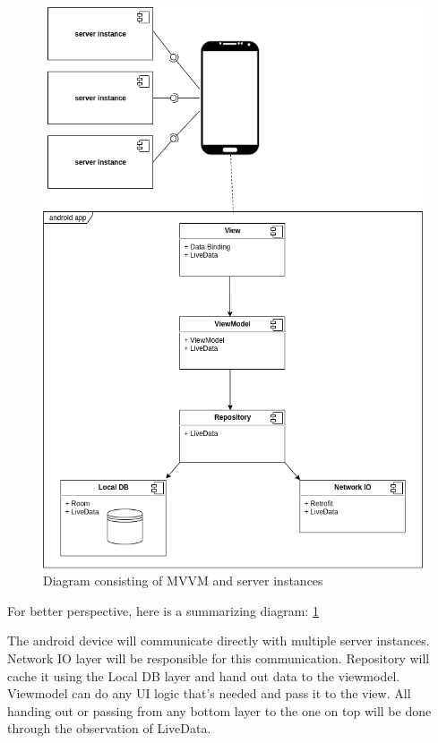 \begin{figure}\centering
	\includegraphics[width=1\textwidth]{pics/bc-architecture.png}
	\caption[Architecture]{Diagram consisting of MVVM and server instances}\label{fig:architecture}
\end{figure}

For better perspective, here is a summarizing diagram: \ref{fig:architecture}

The android device will communicate directly with multiple server instances. Network IO layer will be responsible for this communication. Repository will cache it using the Local DB layer and hand out data to the viewmodel. Viewmodel can do any UI logic that's needed and pass it to the view. All handing out or passing from any bottom layer to the one on top will be done through the observation of LiveData.